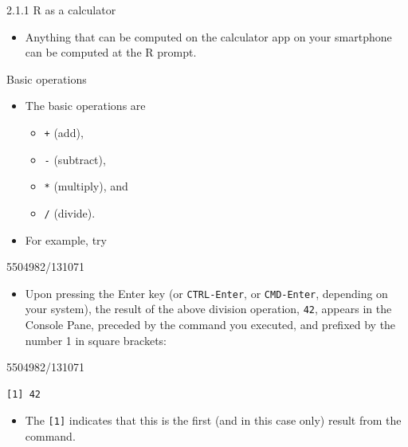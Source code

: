 \documentclass[
  9pt,
  a4paper,
  ignorenonframetext,
  notheorems]{beamer}
\newenvironment{Shaded}{\begin{snugshade}}{\end{snugshade}}
\newcommand{\DecValTok}[1]{\textcolor[rgb]{0.68,0.00,0.00}{#1}}
\newcommand{\SpecialCharTok}[1]{\textcolor[rgb]{0.37,0.37,0.37}{#1}}
\providecommand{\tightlist}{%
  \setlength{\itemsep}{0pt}\setlength{\parskip}{0pt}}\usepackage{longtable,booktabs,array}
\begin{document}
\begin{frame}[fragile]{2.1.1 R as a calculator}
\protect\hypertarget{r-as-a-calculator}{}
\begin{itemize}
\tightlist
\item
  Anything that can be computed on the calculator app on your smartphone
  can be computed at the R prompt.
\end{itemize}

\begin{block}{Basic operations}
\protect\hypertarget{basic-operations}{}
\begin{itemize}
\tightlist
\item
  The basic operations are

  \begin{itemize}
  \tightlist
  \item
    \texttt{+} (add),
  \item
    \texttt{-} (subtract),
  \item
    \texttt{*} (multiply), and
  \item
    \texttt{/} (divide).
  \end{itemize}
\item
  For example, try
\end{itemize}

\begin{Shaded}
\begin{Highlighting}[]
\DecValTok{5504982}\SpecialCharTok{/}\DecValTok{131071}
\end{Highlighting}
\end{Shaded}

\begin{itemize}
\tightlist
\item
  Upon pressing the Enter key (or \texttt{CTRL-Enter}, or
  \texttt{CMD-Enter}, depending on your system), the result of the above
  division operation, \texttt{42}, appears in the Console Pane, preceded
  by the command you executed, and prefixed by the number 1 in square
  brackets:
\end{itemize}

\begin{Shaded}
\begin{Highlighting}[]
\DecValTok{5504982}\SpecialCharTok{/}\DecValTok{131071}
\end{Highlighting}
\end{Shaded}

\begin{verbatim}
[1] 42
\end{verbatim}

\begin{itemize}
\tightlist
\item
  The \texttt{{[}1{]}} indicates that this is the first (and in this
  case only) result from the command.
\end{itemize}
\end{block}
\end{frame}
\end{document}
